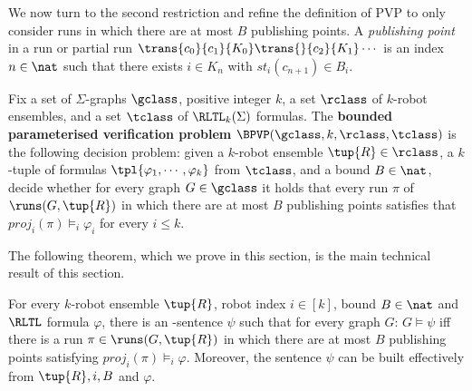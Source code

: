 We now turn to the second restriction and refine the definition of PVP to only consider runs in which there are at most $B$ publishing points.
A \emph{publishing point} in a run or partial run $\trans{c_0}{c_1}{K_0} \trans{}{c_2}{K_1} \cdots$ 
is an index $n \in \nat$ such that there exists $i \in K_n$ with 
$st_i(c_{n+1}) \in B_i$.

\begin{definition}
Fix a set of $\Sigma$-graphs $\gclass$, positive integer $k$, a set  $\rclass$ of $k$-robot ensembles, and a set $\tclass$ of $\RLTL_k(\Sigma)$ formulas. 
The \textbf{bounded parameterised verification problem} $\BPVP(\gclass,k,\rclass,\tclass)$ is the following decision problem:
given a $k$-robot ensemble $\tup{R} \in \rclass$, a $k$-tuple of \RLTL formulas $\tpl{\varphi_1,\cdots,\varphi_k}$ from $\tclass$, and a bound $B \in \nat$, decide whether for every graph $G \in \gclass$ it holds that every run $\pi$ of $\runs(G,\tup{R})$ in which there are at most $B$ publishing points satisfies that
$proj_i(\pi) \models_i \varphi_i$ for every $i \leq k$.
\end{definition}

%

The following theorem, which we prove in this section, is the main technical result of this section.
 \begin{theorem}[Reduction] \label{thm:reduction} 
  For every $k$-robot ensemble $\tup{R}$, robot index $i \in [k]$, bound $B \in \nat$ and $\RLTL$ formula $\varphi$, there is an \msol-sentence $\psi$ such that for every graph $G$: 
  $G \models \psi$ iff there is a run $\pi \in \runs(G,\tup{R})$ in which there are at most $B$ publishing points satisfying $proj_i(\pi) \models_i \varphi$. 
  Moreover, the sentence $\psi$ can be built effectively from $\tup{R},i,B$ and $\varphi$.
 \end{theorem}

